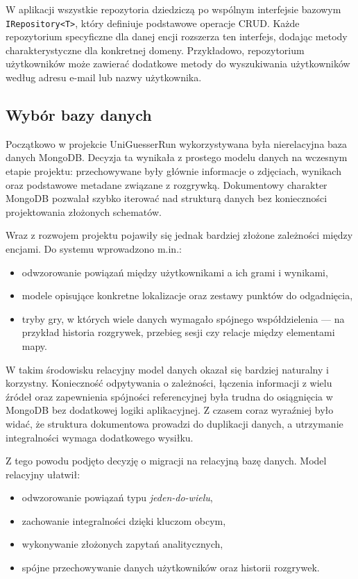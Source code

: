 W aplikacji wszystkie repozytoria dziedziczą po wspólnym interfejsie bazowym \texttt{IRepository<T>}, który definiuje podstawowe operacje CRUD. Każde repozytorium specyficzne dla danej encji rozszerza ten interfejs, dodając metody charakterystyczne dla konkretnej domeny. Przykładowo, repozytorium użytkowników może zawierać dodatkowe metody do wyszukiwania użytkowników według adresu e-mail lub nazwy użytkownika.

\subsection{Wybór bazy danych}
Początkowo w projekcie UniGuesserRun wykorzystywana była nierelacyjna baza danych MongoDB. Decyzja ta wynikała z prostego modelu danych na wczesnym etapie projektu: przechowywane były głównie informacje o zdjęciach, wynikach oraz podstawowe metadane związane z rozgrywką. Dokumentowy charakter MongoDB pozwalał szybko iterować nad strukturą danych bez konieczności projektowania złożonych schematów.

\pagebreak

Wraz z rozwojem projektu pojawiły się jednak bardziej złożone zależności między encjami. Do systemu wprowadzono m.in.:
\begin{itemize}
    \item odwzorowanie powiązań między użytkownikami a ich grami i wynikami,
    \item modele opisujące konkretne lokalizacje oraz zestawy punktów do odgadnięcia,
    \item tryby gry, w których wiele danych wymagało spójnego współdzielenia — na przykład historia rozgrywek, przebieg sesji czy relacje między elementami mapy.
\end{itemize}

W takim środowisku relacyjny model danych okazał się bardziej naturalny i korzystny. Konieczność odpytywania o zależności, łączenia informacji z wielu źródeł oraz zapewnienia spójności referencyjnej była trudna do osiągnięcia w MongoDB bez dodatkowej logiki aplikacyjnej. Z czasem coraz wyraźniej było widać, że struktura dokumentowa prowadzi do duplikacji danych, a utrzymanie integralności wymaga dodatkowego wysiłku.

Z tego powodu podjęto decyzję o migracji na relacyjną bazę danych. Model relacyjny ułatwił:
\begin{itemize}
    \item odwzorowanie powiązań typu \textit{jeden-do-wielu},
    \item zachowanie integralności dzięki kluczom obcym,
    \item wykonywanie złożonych zapytań analitycznych,
    \item spójne przechowywanie danych użytkowników oraz historii rozgrywek.
\end{itemize}


